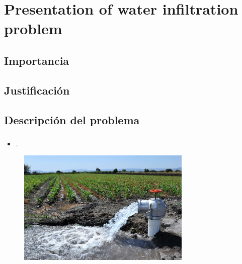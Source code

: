 \section{Presentation of water infiltration problem}
\subsection{Importancia}
\subsection{Justificación}
\subsection{Descripción del problema}
\begin{frame}
	\frametitle{\secname}
	\begin{minipage}{0.5\textwidth}
		\begin{itemize}
			\item .
		\end{itemize}
	\end{minipage}
	\begin{minipage}{0.47\textwidth}
		\begin{figure}[ht!]
			\centering
			\includegraphics[height=5.5cm]{wasted_water}
		\end{figure}
	\end{minipage}
\end{frame}


